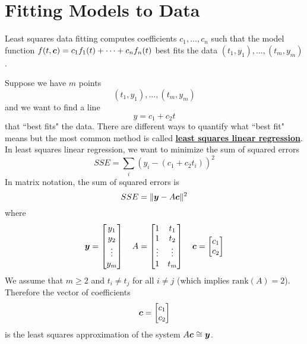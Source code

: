 \section{Fitting Models to Data}

\begin{bigidea}
Least squares data fitting computes coefficients $c_1,\dots,c_n$ such that the model function $f(t,\boldsymbol{c}) = c_1 f_1(t) + \cdots + c_n f_n(t)$ best fits the data $(t_1,y_1),\dots,(t_m,y_m)$.
\end{bigidea}

\begin{definition}
Suppose we have $m$ points
$$
(t_1,y_1) , \dots , (t_m,y_m)
$$
and we want to find a line
$$
y=c_1 + c_2t
$$
that ``best fits" the data. There are different ways to quantify what ``best fit" means but the most common method is called \href{https://en.wikipedia.org/wiki/Simple_linear_regression}{\bf least squares linear regression}. In least squares linear regression, we want to minimize the sum of squared errors
$$
SSE = \sum_i (y_i - (c_1 + c_2 t_i))^2
$$
In matrix notation, the sum of squared errors is
$$
SSE = \Vert \boldsymbol{y} - A \boldsymbol{c} \Vert^2
$$
where
$$
\boldsymbol{y} = \begin{bmatrix} y_1 \\ y_2 \\ \vdots \\ y_m \end{bmatrix}
\ \ \
A = \begin{bmatrix} 1 & t_1 \\ 1 & t_2 \\ \vdots & \vdots \\ 1 & t_m \end{bmatrix}
\ \ \
\boldsymbol{c} = \begin{bmatrix} c_1 \\ c_2 \end{bmatrix}
$$
We assume that $m \geq 2$ and $t_i \not= t_j$ for all $i \not= j$ (which implies $\mathrm{rank}(A) = 2$). Therefore the vector of coefficients
$$
\boldsymbol{c} = \begin{bmatrix} c_1 \\ c_2 \end{bmatrix}
$$
is the least squares approximation of the system $A \boldsymbol{c} \cong \boldsymbol{y}$.
\end{definition}

